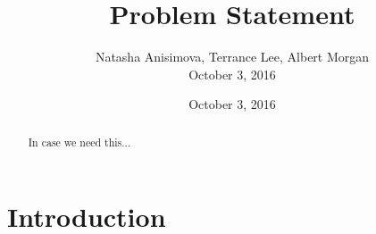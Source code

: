 \documentclass[letterpaper,10pt,draftclsnofoot,onecolumn]{IEEEtran}
\title{Problem Statement}
\date{October 3, 2016}
\author{Natasha Anisimova, Terrance Lee, Albert Morgan
	
	October 3, 2016}
\begin{document}
\maketitle
	\tableofcontents


\begin{abstract}
	In case we need this...
\end{abstract}
	
	\section{Introduction}
	
	
\end{document}
